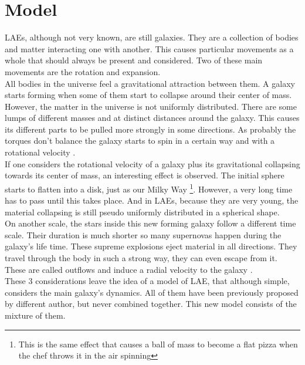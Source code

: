 \setcounter{equation}{0}
\chapter{Model}
\label{chap:model}

LAEs, although not very known, are still galaxies. They are a collection of bodies and matter interacting one with another. This causes particular movements as a whole that should always be present and considered. Two of these main movements are the rotation and expansion. \\

All bodies in the universe feel a gravitational attraction between them. A galaxy starts forming when some of them start to collapse around their center of mass. However, the matter in the universe is not uniformly distributed. There are some lumps of different masses and at distinct distances around the galaxy. This causes its different parts to be pulled more strongly in some directions. As probably the torques don't balance the galaxy starts to spin in a certain way and with a rotational velocity \vrot. \\

If one considers the rotational velocity of a galaxy plus its gravitational collapsing towards its center of mass, an interesting effect is observed. The initial sphere starts to flatten into a disk, just as our Milky Way \footnote{This is the same effect that causes a ball of mass to become a flat pizza when the chef throws it in the air spinning}. However, a very long time has to pass until this takes place. And in LAEs, because they are very young, the material collapsing is still pseudo uniformly distributed in a spherical shape. \\

On another scale, the stars inside this new forming galaxy follow a different time scale. Their duration is much shorter so many supernovas happen during the galaxy's life time. These supreme explosions eject material in all directions. They travel through the body in such a strong way, they can even escape from it. These are called outflows and induce a radial velocity to the galaxy \vout. \\ 

These 3 considerations leave the idea of a model of LAE, that although simple, considers the main galaxy's dynamics. All of them have been previously proposed by different author, but never combined together. This new model consists of the mixture of them.\\

